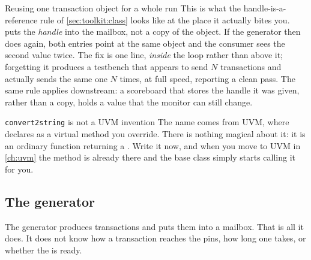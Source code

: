 \begin{gotcha}{Reusing one transaction object for a whole run}
This is what the handle-is-a-reference rule of \cref{sec:toolkit:class} looks like at
the place it actually bites you.  puts the \emph{handle} into
the mailbox, not a copy of the object. If the generator then does
 again, both entries point at the same object
and the consumer sees the second value twice. The fix is one line,
 \emph{inside} the loop rather than above it;
forgetting it produces a testbench that appears to send $N$ transactions and
actually sends the same one $N$ times, at full speed, reporting a clean pass.
The same rule applies downstream: a scoreboard that stores the handle it was
given, rather than a copy, holds a value that the monitor can still change.
\end{gotcha}

\begin{notebox}{\texttt{convert2string} is not a UVM invention}
The name comes from UVM, where  declares
 as a virtual method you override. There is nothing
magical about it: it is an ordinary function returning a . Write
it now, and when you move to UVM in \cref{ch:uvm} the method is already there
and the base class simply starts calling it for you.
\end{notebox}

\subsection{The generator}

The generator produces transactions and puts them into a
mailbox. That is all it does. It does not know how a transaction reaches the
pins, how long one takes, or whether the \DUT{} is ready.


